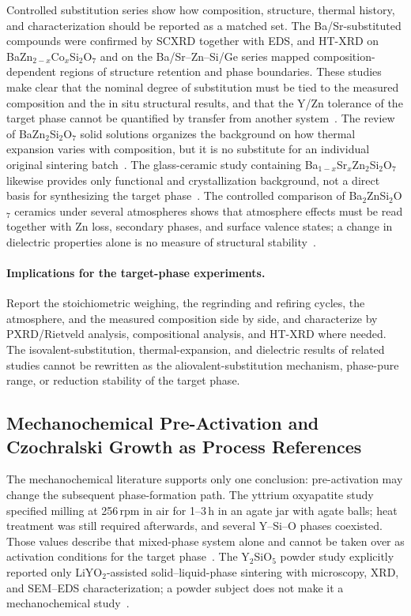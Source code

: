 Controlled substitution series show how composition, structure, thermal history, and characterization should be reported as a matched set. The Ba\slash Sr-substituted compounds were confirmed by SCXRD together with EDS, and HT-XRD on BaZn$_{2-x}$Co$_x$Si$_2$O$_7$ and on the Ba\slash Sr--Zn--Si\slash Ge series mapped composition-dependent regions of structure retention and phase boundaries. These studies make clear that the nominal degree of substitution must be tied to the measured composition and the in situ structural results, and that the Y\slash Zn tolerance of the target phase cannot be quantified by transfer from another system~\cite{thieme2015ba1,kerstan2013bazn2si2o7,thieme2016negative}. The review of BaZn$_2$Si$_2$O$_7$ solid solutions organizes the background on how thermal expansion varies with composition, but it is no substitute for an individual original sintering batch~\cite{thieme2022solid}. The glass-ceramic study containing Ba$_{1-x}$Sr$_x$Zn$_2$Si$_2$O$_7$ likewise provides only functional and crystallization background, not a direct basis for synthesizing the target phase~\cite{thieme2017variable}. The controlled comparison of Ba$_2$ZnSi$_2$O$_7$ ceramics under several atmospheres shows that atmosphere effects must be read together with Zn loss, secondary phases, and surface valence states; a change in dielectric properties alone is no measure of structural stability~\cite{zou2019anti}.

\paragraph{Implications for the target-phase experiments.} Report the stoichiometric weighing, the regrinding and refiring cycles, the atmosphere, and the measured composition side by side, and characterize by PXRD\slash Rietveld analysis, compositional analysis, and HT-XRD where needed. The isovalent-substitution, thermal-expansion, and dielectric results of related studies cannot be rewritten as the aliovalent-substitution mechanism, phase-pure range, or reduction stability of the target phase.

\subsection{Mechanochemical Pre-Activation and Czochralski Growth as Process References}

The mechanochemical literature supports only one conclusion: pre-activation may change the subsequent phase-formation path. The yttrium oxyapatite study specified milling at 256\,rpm in air for 1--3\,h in an agate jar with agate balls; heat treatment was still required afterwards, and several Y--Si--O phases coexisted. Those values describe that mixed-phase system alone and cannot be taken over as activation conditions for the target phase~\cite{tzvetkov2001effects}. The Y$_2$SiO$_5$ powder study explicitly reported only LiYO$_2$-assisted solid--liquid-phase sintering with microscopy, XRD, and SEM--EDS characterization; a powder subject does not make it a mechanochemical study~\cite{yldrm2009y2sio5}.

